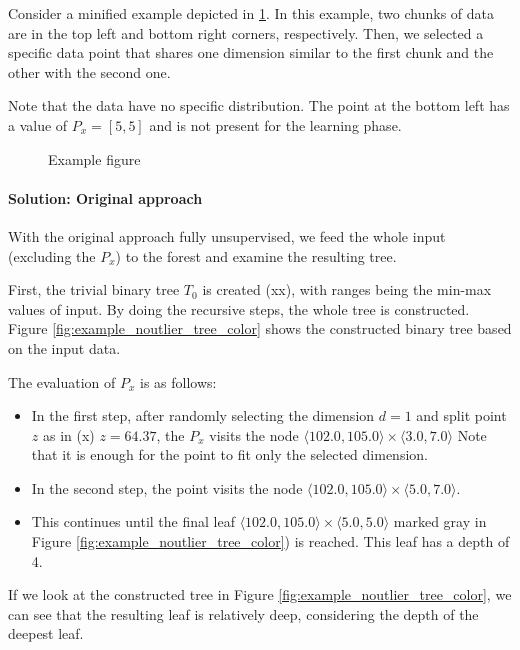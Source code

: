 Consider a minified example depicted in \ref{fig:example_data}. In this example, two chunks of data are in the top left and bottom right corners, respectively. Then, we selected a specific data point that shares one dimension similar to the first chunk and the other with the second one.

Note that the data have no specific distribution. The point at the bottom left has a value of $P_x = [5,5]$ and is not present for the learning phase.

\begin{figure}[htbp]
\centering

\caption{Example figure}
\label{fig:example_data}
\end{figure}



\paragraph{Solution: Original approach}
With the original approach fully unsupervised, we feed the whole input (excluding the $P_x$) to the forest and examine the resulting tree.

First, the trivial binary tree $T_0$ is created (xx), with ranges being the min-max values of input.
By doing the recursive steps, the whole tree is constructed.
Figure \ref{fig:example_noutlier_tree_color} shows the constructed binary tree based on the input data.

The evaluation of $P_x$ is as follows:
\begin{itemize}
    \item In the first step, after randomly selecting the dimension $d=1$ and split point $z$ as in (x) $z = 64.37$, the $P_x$ visits the node $\langle 102.0, 105.0\rangle \times \langle 3.0, 7.0\rangle$
    Note that it is enough for the point to fit only the selected dimension.
    \item In the second step, the point visits the node $\langle 102.0, 105.0\rangle \times \langle 5.0, 7.0\rangle$.
    \item This continues until the final leaf $\langle 102.0, 105.0\rangle \times \langle 5.0, 5.0\rangle$ marked gray in Figure \ref{fig:example_noutlier_tree_color}) is reached. This leaf has a depth of 4.
    
\end{itemize}


If we look at the constructed tree in Figure \ref{fig:example_noutlier_tree_color}, we can see that the resulting leaf is relatively deep, considering the depth of the deepest leaf.






